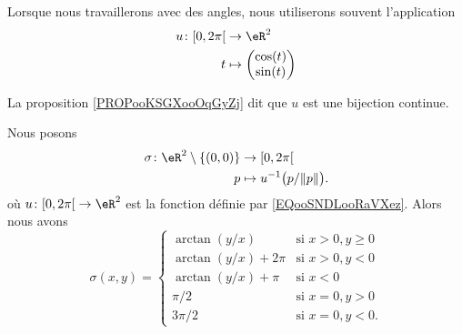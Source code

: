 Lorsque nous travaillerons avec des angles, nous utiliserons souvent l'application
\begin{equation}		\label{EQooSNDLooRaVXez}
	\begin{aligned}
		u\colon \mathopen[ 0,2\pi\mathclose[ & \to \eR^2              \\
		t                                    & \mapsto \begin{pmatrix}
			                                               \cos(t) \\
			                                               \sin(t)
		                                               \end{pmatrix}
	\end{aligned}
\end{equation}

La proposition \ref{PROPooKSGXooOqGyZj} dit que \( u\) est une bijection continue.
\begin{proposition}	\label{PROPooAVVQooNPUPpn}
	Nous posons
	\begin{equation}
		\begin{aligned}
			\sigma\colon \eR^2\setminus\{ (0,0) \} & \to \mathopen[ 0,2\pi\mathclose[     \\
			p                                      & \mapsto u^{-1}\big( p/\| p \| \big).
		\end{aligned}
	\end{equation}
	où \(u \colon \mathopen[ 0,2\pi\mathclose[\to \eR^2  \) est la fonction définie par \ref{EQooSNDLooRaVXez}.
	Alors nous avons
	\begin{equation}		\label{EQooVQWEooXHjxQa}
		\sigma(x,y)=\begin{cases}
			\arctan(y/x)      & \text{si } x>0, y\geq 0 \\
			\arctan(y/x)+2\pi & \text{si } x>0,y<0      \\
			\arctan(y/x)+\pi  & \text{si } x<0          \\
			\pi/2             & \text{si } x=0, y>0     \\
			3\pi/2            & \text{si } x=0, y<0.
		\end{cases}
	\end{equation}
\end{proposition}

